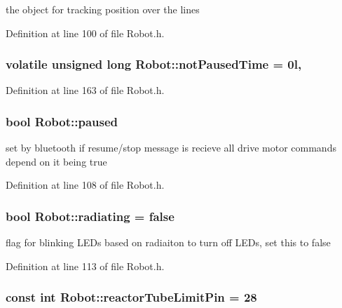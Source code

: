 the object for tracking position over the lines 



Definition at line 100 of file Robot.\-h.

\hypertarget{classRobot_a4eb9957add77241230cdf010b4eced16}{
\subsubsection[{not\-Paused\-Time}]{\setlength{\rightskip}{0pt plus 5cm}volatile unsigned long Robot\-::not\-Paused\-Time = 0l\hspace{0.3cm}{\ttfamily [static]}, {\ttfamily [private]}}}\label{classRobot_a4eb9957add77241230cdf010b4eced16}


Definition at line 163 of file Robot.\-h.

\hypertarget{classRobot_a6a1fae6e6ee0a3298b9e60d3f50ad12a}{
\subsubsection[{paused}]{\setlength{\rightskip}{0pt plus 5cm}bool Robot\-::paused}}\label{classRobot_a6a1fae6e6ee0a3298b9e60d3f50ad12a}


set by bluetooth if resume/stop message is recieve all drive motor commands depend on it being true 



Definition at line 108 of file Robot.\-h.

\hypertarget{classRobot_a77f62d85ab1cf34e79c2a3acd470a4ce}{
\subsubsection[{radiating}]{\setlength{\rightskip}{0pt plus 5cm}bool Robot\-::radiating = false}}\label{classRobot_a77f62d85ab1cf34e79c2a3acd470a4ce}


flag for blinking L\-E\-Ds based on radiaiton to turn off L\-E\-Ds, set this to false 



Definition at line 113 of file Robot.\-h.

\hypertarget{classRobot_a351d754436c8f569432ef7a06641f98a}{
\subsubsection[{reactor\-Tube\-Limit\-Pin}]{\setlength{\rightskip}{0pt plus 5cm}const int Robot\-::reactor\-Tube\-Limit\-Pin = 28\hspace{0.3cm}{\ttfamily [private]}}}\label{classRobot_a351d754436c8f569432ef7a06641f98a}


